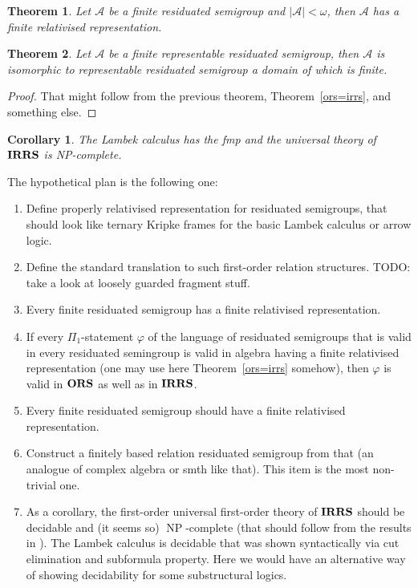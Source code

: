 \documentclass[a4paper]{article}
\theoremstyle{defin}
\theoremstyle{theorem}
\newtheorem{theorem}{Theorem}
\theoremstyle{prop}
\theoremstyle{lemma}
\theoremstyle{ex}
\theoremstyle{col}
\newtheorem{col}{Corollary}
\begin{document}
\begin{theorem}
  Let $\mathcal{A}$ be a finite residuated semigroup and
  $|\mathcal{A}| < \omega$, then $\mathcal{A}$ has a finite relativised representation.
\end{theorem}

\begin{theorem}
  Let $\mathcal{A}$ be a finite representable residuated semigroup, then $\mathcal{A}$ is isomorphic to
  representable residuated semigroup a domain of which is finite.
\end{theorem}

\begin{proof}
  That might follow from the previous theorem, Theorem~\ref{ors=irrs}, and something else.
\end{proof}

\begin{col}
  The Lambek calculus has the fmp and the universal theory of ${\bf IRRS}$ is NP-complete.
\end{col}

The hypothetical plan is the following one:
\begin{enumerate}
\item Define properly relativised representation for residuated semigroups, that should look like ternary Kripke frames for the basic Lambek calculus or arrow logic.
\item Define the standard translation to such first-order relation structures. TODO: take a look at loosely guarded fragment stuff.
\item Every finite residuated semigroup has a finite relativised representation.
\item If every $\Pi_1$-statement $\varphi$ of the language of residuated semigroups that is valid in every
residuated semingroup is valid in algebra having a finite relativised representation (one may use here Theorem~\ref{ors=irrs} somehow), then $\varphi$ is valid in ${\bf ORS}$ as well as in ${\bf IRRS}$.
\item Every finite residuated semigroup should have a finite relativised representation.
\item Construct a finitely based relation residuated semigroup from that (an analogue of complex algebra or smth like that). This item is the most non-trivial one.
\item As a corollary, the first-order universal first-order theory of ${\bf IRRS}$ should be decidable and
(it seems so) $\operatorname{NP}$-complete (that should follow from the results in \cite{pentus2006lambek}). The Lambek calculus is decidable that was shown syntactically via cut elimination and subformula property.
Here we would have an alternative way of showing decidability for some substructural logics.
\end{enumerate}
\end{document}
